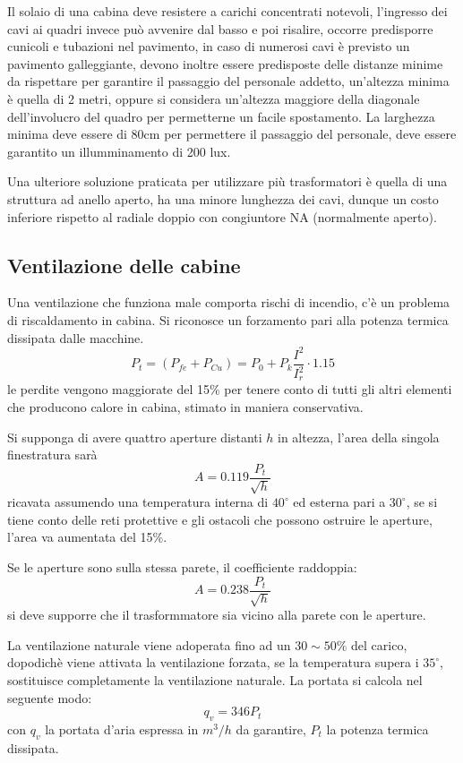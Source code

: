 
Il solaio di una cabina deve resistere a carichi concentrati notevoli, 
l'ingresso dei cavi ai quadri invece può avvenire dal basso e poi risalire, 
occorre predisporre cunicoli e tubazioni nel pavimento, in caso di numerosi 
cavi è previsto un pavimento galleggiante, devono inoltre essere predisposte 
delle distanze minime da rispettare per garantire il passaggio del personale 
addetto, un'altezza minima è quella di 2 metri, oppure si considera un'altezza 
maggiore della diagonale dell'involucro del quadro per permetterne un facile 
spostamento. La larghezza minima deve essere di 80cm per permettere il 
passaggio del personale, deve essere garantito un illumminamento di 200 lux.

Una ulteriore soluzione praticata per utilizzare più trasformatori è quella di 
una struttura ad anello aperto, ha una minore lunghezza dei cavi, dunque un 
costo inferiore rispetto al radiale doppio con congiuntore NA (normalmente 
aperto).

\subsection{Ventilazione delle cabine}
Una ventilazione che funziona male comporta rischi di incendio, c'è un problema 
di riscaldamento in cabina. Si riconosce un forzamento pari alla potenza termica dissipata dalle macchine.
$$
P_t = (P_{fe} + P_{Cu}) = P_0 + P_k\frac{I^2}{I^2_r}\cdot 1.15
$$
le perdite vengono maggiorate del 15\% per tenere conto di tutti gli altri 
elementi che producono calore in cabina, stimato in maniera conservativa.

Si supponga di avere quattro aperture distanti $h$ in altezza, l'area della singola finestratura sarà
$$
A = 0.119 \frac{P_t}{\sqrt{h}}
$$
ricavata assumendo una temperatura interna di $40^\circ$ ed esterna pari a $30^\circ$, se si tiene conto delle reti protettive e gli ostacoli che possono ostruire le aperture, l'area va aumentata del 15\%.

Se le aperture sono sulla stessa parete, il coefficiente raddoppia:
$$
A = 0.238 \frac{P_t}{\sqrt{h}}
$$
si deve supporre che il trasformmatore sia vicino alla parete con le aperture.

La ventilazione naturale viene adoperata fino ad un $30\sim50\%$ del carico, dopodichè viene attivata la ventilazione forzata, se la temperatura supera i $35^\circ$, sostituisce completamente la ventilazione naturale. 
La portata si calcola nel seguente modo:
$$
q_v = 346 P_t
$$
con $q_v$ la portata d'aria espressa in $m^3/h$ da garantire, $P_t$ la potenza 
termica dissipata.


